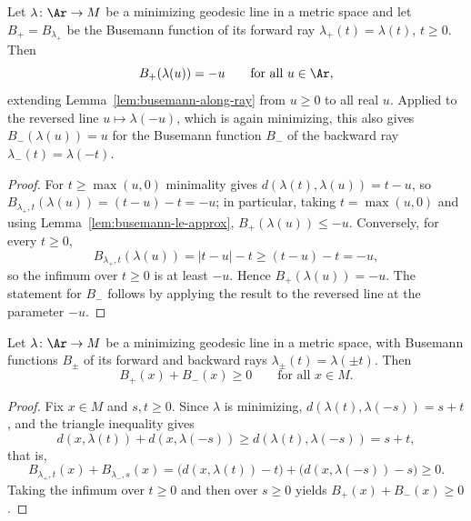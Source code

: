 \begin{lemma}
\label{lem:busemann-along-line}
\leanok
{}
Let $\lambda\colon\Ar\to M$ be a minimizing geodesic line in a
metric space and let $B_+=B_{\lambda_+}$ be the Busemann function of
its forward ray $\lambda_+(t)=\lambda(t)$, $t\ge0$. Then
$$B_+(\lambda(u))=-u\qquad\text{for all } u\in\Ar,$$
extending Lemma~\ref{lem:busemann-along-ray} from $u\ge0$ to all
real $u$. Applied to the reversed line $u\mapsto\lambda(-u)$, which
is again minimizing, this also gives $B_-(\lambda(u))=u$ for the
Busemann function $B_-$ of the backward ray
$\lambda_-(t)=\lambda(-t)$.
\end{lemma}

\begin{proof}
\leanok
{}
For $t\ge\max(u,0)$ minimality gives
$d(\lambda(t),\lambda(u))=t-u$, so
$B_{\lambda_+,t}(\lambda(u))=(t-u)-t=-u$; in particular, taking
$t=\max(u,0)$ and using Lemma~\ref{lem:busemann-le-approx},
$B_+(\lambda(u))\le-u$. Conversely, for every $t\ge0$,
$$B_{\lambda_+,t}(\lambda(u))=|t-u|-t\ge(t-u)-t=-u,$$
so the infimum over $t\ge0$ is at least $-u$. Hence
$B_+(\lambda(u))=-u$. The statement for $B_-$ follows by applying
the result to the reversed line at the parameter $-u$.
\end{proof}

\begin{lemma}
\label{lem:busemann-pair-nonneg}
\leanok
{}
Let $\lambda\colon\Ar\to M$ be a minimizing geodesic line in a
metric space, with Busemann functions $B_\pm$ of its forward and
backward rays $\lambda_\pm(t)=\lambda(\pm t)$. Then
$$B_+(x)+B_-(x)\ge0\qquad\text{for all } x\in M.$$
\end{lemma}

\begin{proof}
\leanok
{}
Fix $x\in M$ and $s,t\ge0$. Since $\lambda$ is minimizing,
$d(\lambda(t),\lambda(-s))=s+t$, and the triangle inequality gives
$$d(x,\lambda(t))+d(x,\lambda(-s))\ge d(\lambda(t),\lambda(-s))
=s+t,$$
that is,
$$B_{\lambda_+,t}(x)+B_{\lambda_-,s}(x)
=\bigl(d(x,\lambda(t))-t\bigr)+\bigl(d(x,\lambda(-s))-s\bigr)
\ge0.$$
Taking the infimum over $t\ge0$ and then over $s\ge0$ yields
$B_+(x)+B_-(x)\ge0$.
\end{proof}

